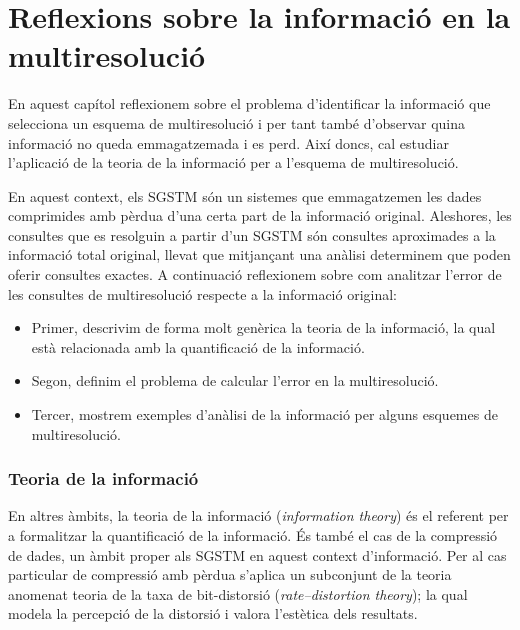 \chapter{Reflexions sobre la informació en la multiresolució}




En aquest capítol reflexionem sobre el problema d'identificar la
informació que selecciona un esquema de multiresolució i per tant
també d'observar quina informació no queda emmagatzemada i es perd.
Així doncs, cal estudiar l'aplicació de la teoria de la informació per
a l'esquema de multiresolució.  

En aquest context, els \gls{SGSTM} són un sistemes que emmagatzemen
les dades comprimides amb pèrdua d'una certa part de la informació
original. Aleshores, les consultes que es resolguin a partir d'un
\gls{SGSTM} són consultes aproximades a la informació total original,
llevat que mitjançant una anàlisi determinem que poden oferir
consultes exactes. A continuació reflexionem sobre com analitzar
l'error de les consultes de multiresolució respecte a la informació
original:
\begin{itemize}
\item Primer, descrivim de forma molt genèrica la teoria de la
  informació, la qual està relacionada amb la quantificació de la
  informació.
\item Segon, definim el problema de calcular l'error en la multiresolució.
\item Tercer, mostrem exemples d'anàlisi de la informació per alguns
  esquemes de multiresolució.
\end{itemize}





\subsection{Teoria de la informació}

En altres àmbits, la teoria de la informació (\emph{information
  theory}) és el referent per a formalitzar la quantificació de la
informació. És també el cas de la compressió de dades, un àmbit proper
als \gls{SGSTM} en aquest context d'informació.  Per al cas particular
de compressió amb pèrdua s'aplica un subconjunt de la teoria anomenat
teoria de la taxa de
bit-distorsió %
(\emph{rate–distortion theory}); la qual modela la percepció de la
distorsió i valora l'estètica dels resultats.


